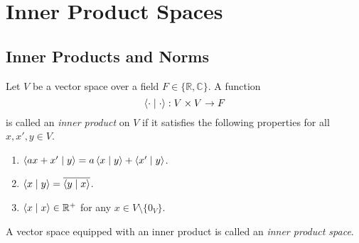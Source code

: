 \chapter{Inner Product Spaces}
\section{Inner Products and Norms}
\begin{definition}
  \label{def:inner-product}
  Let $V$ be a vector space over a field $F \in \{\mathbb{R}, \mathbb{C}\}$.
  A function
  \begin{equation*}
    \left\langle \cdot \; \middle| \; \cdot \right\rangle: V \times V \to F
  \end{equation*}
  is called an \emph{inner product} on $V$ if it satisfies the following
  properties for all $x, x', y \in V$.
  \begin{enumerate}
    \item $\left\langle ax + x' \; \middle| \; y \right\rangle = a\left\langle x \; \middle| \; y \right\rangle + \left\langle x' \; \middle| \; y \right\rangle$.
    \item $\left\langle x \; \middle| \; y \right\rangle = \overline{\left\langle y \; \middle| \; x \right\rangle}$.
    \item $\left\langle x \; \middle| \; x \right\rangle \in \mathbb{R}^+$ for any $x \in V \setminus \{0_V\}$.
  \end{enumerate}
  A vector space equipped with an inner product is called an
  \emph{inner product space}.
\end{definition}

